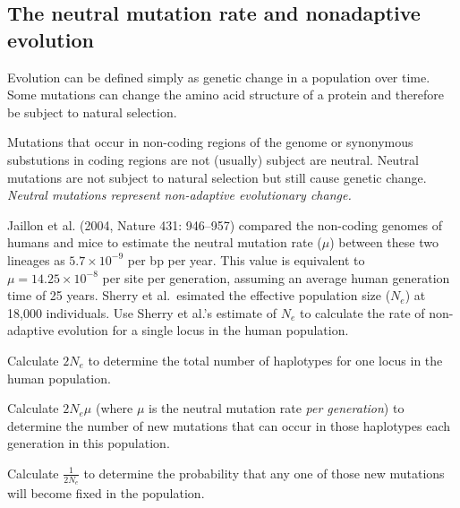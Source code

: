 \documentclass[11pt, addpoints, hidelinks]{exam}
\begin{document}
\begin{questions}
\newpage

\subsection*{The neutral mutation rate and nonadaptive evolution}

Evolution can be defined simply as genetic change in a population over time. Some mutations can change the amino acid structure of a protein and therefore be subject to natural selection.

Mutations that occur in non-coding regions of the genome or synonymous substutions in coding regions are not (usually) subject are neutral. Neutral mutations are not subject to natural selection but still cause genetic change. \emph{Neutral mutations represent non-adaptive evolutionary change.} 

Jaillon et al. (2004, Nature 431: 946--957) compared the non-coding genomes of humans and mice to estimate the neutral mutation rate ($\mu$) between these two lineages as $5.7 \times 10^{-9}$ per bp per year.  This value is equivalent to $\mu = 14.25 \times 10^{-8}$ per site per generation, assuming an average human generation time of 25 years. Sherry et al.~esimated the effective population size ($N_e$) at 18,000 individuals. Use Sherry et al.'s estimate of $N_e$ to calculate  the rate of non-adaptive evolution for a single locus in the human population. 

\question
\label{itm:jaillon} Calculate $2N_e$ to determine the total number of haplotypes for one locus in the human population.

\ifprintanswers\vspace*{\baselineskip}{\bfseries%
	$2N_e = 2 \times 18,000 = 36,000$ haplotypes.}
\else
\fi


\question
Calculate $2N_e\mu$ (where $\mu$ is the neutral mutation rate \emph{per generation}) to determine the number of new mutations that can occur in those haplotypes each generation in this population.

\ifprintanswers\vspace*{\baselineskip}{\bfseries%
	$2N_e\mu = 36,000 \times 14.25 = 0.00513.$}
\else
\fi

\question
Calculate $\frac{1}{2N_e}$ to determine the probability that any one of those new mutations will become fixed in the population.


\end{questions}
\end{document}

